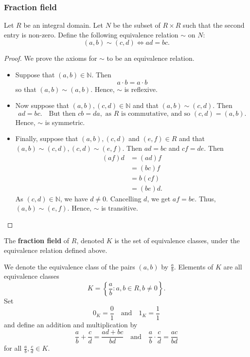\documentclass[12pt, a4paper]{article}
\begin{document}
\subsubsection{Fraction field}

\begin{definition}
    Let \(R\) be an integral domain. Let \(N\) be the subset of \(R \times R\) such that the second entry is non-zero. Define the following equivalence relation \(\sim\) on \(N\):
    \[(a,b) \sim (c,d) \iff ad=bc.\]
\end{definition}

\begin{proof}
    We prove the axioms for \(\sim\) to be an equivalence relation.
    \begin{itemize}
        \item Suppose that $(a, b) \in \mathbb{N}$. Then
        \[
        a \cdot b = a \cdot b
        \]
        so that $(a, b) \sim (a, b)$. Hence, $\sim$ is reflexive.
        
        \item Now suppose that $(a, b), (c, d) \in \mathbb{N}$ and that $(a, b) \sim (c, d)$. Then
        \[
        ad = bc. \quad \text{But then } cb = da, \text{ as } R \text{ is commutative, and so } (c, d) = (a, b).
        \]
        Hence, $\sim$ is symmetric.
        
        \item Finally, suppose that $(a, b), (c, d)$ and $(e, f) \in R$ and that $(a, b) \sim (c, d), (c, d) \sim (e, f)$. Then $ad = bc$ and $cf = de$. Then
        \begin{align*}
        (af)d &= (ad)f \\
        &= (bc)f \\
        &= b(cf) \\
        &= (be)d.
        \end{align*}
        As $(c, d) \in \mathbb{N}$, we have $d \neq 0$. Cancelling $d$, we get $af = be$. Thus, $(a, b) \sim (e, f)$. Hence, $\sim$ is transitive.         
    \end{itemize}
\end{proof}

\begin{definition}
    The \textbf{fraction field} of \(R\), denoted \(K\) is the set of equivalence classes, under the equivalence relation defined above.
\end{definition}

\begin{definition}
    We denote the equivalence class of the pairs \((a,b)\) by \(\frac{a}{b}\). Elements of \(K\) are all equivalence classes 
    \[K = \left\{ \frac{a}{b} : a,b\in R, b\neq 0 \right\}.\]
    Set 
    \[0_K = \frac{0}{1} \quad \text{and} \quad 1_K=\frac{1}{1}\]
    and define an addition and multiplication by 
    \[\frac{a}{b}+\frac{c}{d}=\frac{ad+bc}{bd} \quad \text{and} \quad \frac{a}{b}\cdot \frac{c}{d}=\frac{ac}{bd}\]
    for all \(\frac{a}{b},\frac{c}{d}\in K\).
\end{definition}
\end{document}
